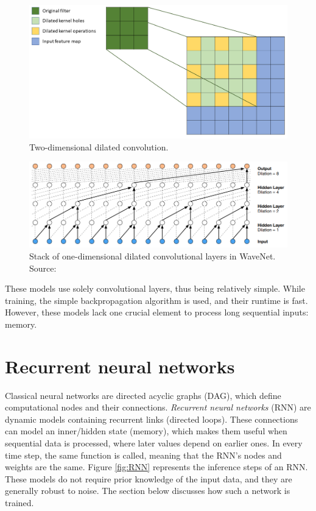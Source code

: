 \begin{figure}[H]
 \centerline{\includegraphics[width=0.8\columnwidth]{.//Figure/Sequential/dilated_convolution.png}}
 \caption{Two-dimensional dilated convolution.}
 \label{fig:dilated_convolution}
\end{figure}

\begin{figure}[H]
 \centerline{\includegraphics[width=1.0\columnwidth]{.//Figure/Sequential/WaveNet_dilation.png}}
 \caption{Stack of one-dimensional dilated convolutional layers in WaveNet. Source: \cite{WaveNet}}
 \label{fig:WaveNet_dilation}
\end{figure}

These models use solely convolutional layers, thus being relatively simple. While training, the simple backpropagation algorithm is used, and their runtime is fast. However, these models lack one crucial element to process long sequential inputs: memory.

\section{Recurrent neural networks}

Classical neural networks are directed acyclic graphs (DAG), which define computational nodes and their connections. \textit{Recurrent neural networks} (RNN) are dynamic models containing recurrent links (directed loops). These connections can model an inner/hidden state (memory), which makes them useful when sequential data is processed, where later values depend on earlier ones. In every time step, the same function is called, meaning that the RNN's nodes and weights are the same. Figure \ref{fig:RNN} represents the inference steps of an RNN. These models do not require prior knowledge of the input data, and they are generally robust to noise\cite{CTC}. The section below discusses how such a network is trained.

